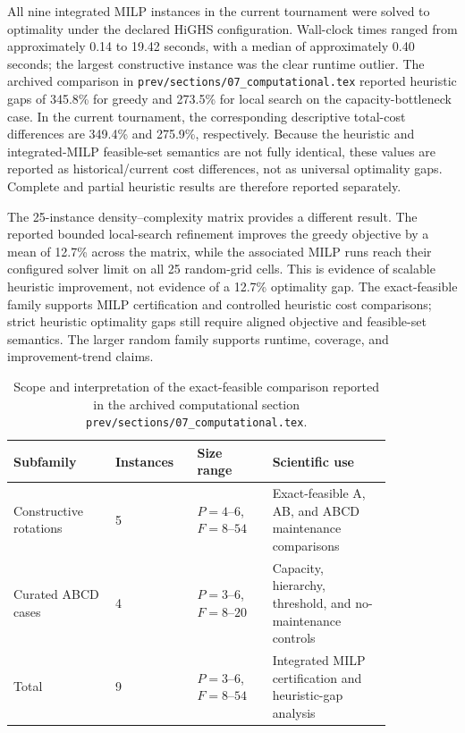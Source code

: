 All nine integrated MILP instances in the current tournament were solved to
optimality under the declared HiGHS configuration. Wall-clock times ranged
from approximately 0.14 to 19.42 seconds, with a median of approximately
0.40 seconds; the largest constructive instance was the clear runtime outlier.
The archived comparison in \texttt{prev/sections/07\_computational.tex}
reported heuristic gaps of 345.8\% for greedy and 273.5\% for local search on
the capacity-bottleneck case. In the current tournament, the corresponding
descriptive total-cost differences are 349.4\% and 275.9\%, respectively.
Because the heuristic and integrated-MILP feasible-set semantics are not fully
identical, these values are reported as historical/current cost differences,
not as universal optimality gaps. Complete and partial heuristic results are
therefore reported separately.

The 25-instance density--complexity matrix provides a different result. The
reported bounded local-search refinement improves the greedy objective by a
mean of 12.7\% across the matrix, while the associated MILP runs reach their
configured solver limit on all 25 random-grid cells. This is evidence of
scalable heuristic improvement, not evidence of a 12.7\% optimality gap. The
exact-feasible family supports MILP certification and controlled heuristic
cost comparisons; strict heuristic optimality gaps still require aligned
objective and feasible-set semantics. The larger random family supports
runtime, coverage, and improvement-trend claims.

\begin{table}[t]
\centering\small
\caption{Scope and interpretation of the exact-feasible comparison reported in
the archived computational section \texttt{prev/sections/07\_computational.tex}.}
\label{tab:exact_feasible_summary}
\begin{tabular}{p{0.23\linewidth}p{0.17\linewidth}p{0.17\linewidth}p{0.27\linewidth}}
\toprule
Subfamily & Instances & Size range & Scientific use \\
\midrule
Constructive rotations & 5 & $P=4$--$6$, $F=8$--$54$ & Exact-feasible A, AB, and ABCD maintenance comparisons \\
Curated ABCD cases & 4 & $P=3$--$6$, $F=8$--$20$ & Capacity, hierarchy, threshold, and no-maintenance controls \\
\midrule
Total & 9 & $P=3$--$6$, $F=8$--$54$ & Integrated MILP certification and heuristic-gap analysis \\
\bottomrule
\end{tabular}
\end{table}

